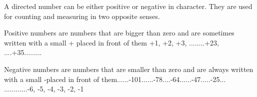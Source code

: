 A directed number can be either positive or negative 
in character. They are used for counting and measuring in two opposite senses.

\par
Positive numbers are numbers that are bigger than zero and are sometimes written 
with a small + placed in front of them  {+1, +2, +3, ........+23, ....+35.........}

\par
Negative numbers are numbers that are smaller than zero and are always written
with a small -placed in front of them{......-101......-78....-64......-47.....-25...
............-6, -5, -4, -3, -2, -1}  